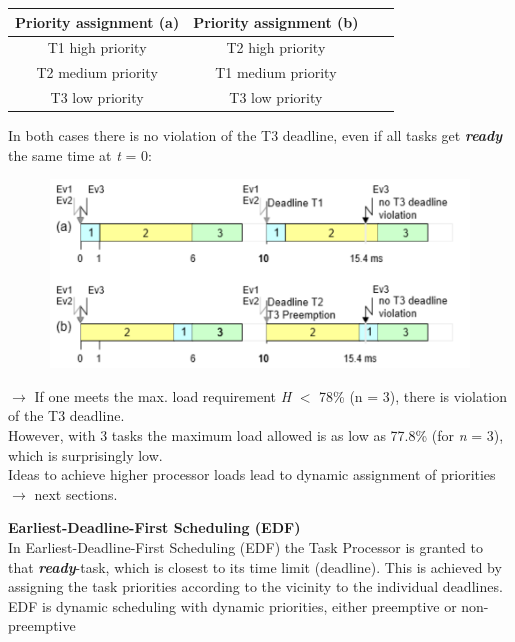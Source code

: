 \begin{table}[h!]
\setlength{\tabcolsep}{10pt} %
\renewcommand{\arraystretch}{1.5} %
\small
\centering
 \begin{tabular}{|c|c|c|c|} 
 \hline
 \textbf{Priority assignment (a)} & \textbf{Priority assignment (b)} \\ [0.1ex] 
 \hline
 T1  high priority & T2  high  priority \\ 
 \hline
 T2  medium priority & T1  medium priority \\ 
  \hline
 T3  low priority & T3  low priority  \\ 
 \hline
 \end{tabular}
\end{table}

In both cases there is no violation of the T3 deadline, even if all tasks get \textbf{\textit{ready}} the same time at \textit{t} = 0: 
	
	\begin{figure}[h]
    \centering
    \includegraphics[width=12cm, height=5cm]{Images/image187.png}
    \label{fig:Fig 46}
    \end{figure}
\nsl{\newpage}
$\rightarrow$ If one meets the max. load requirement \textit{H} $\mathrm{<}$ 78\% (n = 3), there is violation of the T3 deadline.\\

However, with 3 tasks the maximum load allowed is as low as 77.8\% (for \textit{n} = 3), which is surprisingly low.\\

Ideas to achieve higher processor loads lead to dynamic assignment of priorities \\
$\rightarrow$ next sections.\\
\os{\newpage}

{\rot\bf Earliest-Deadline-First Scheduling (EDF)}\\

In Earliest-Deadline-First Scheduling (EDF) the Task Processor is granted to that \textbf{\textit{ready}}-task, which is closest to its time limit (deadline). This is achieved by assigning the task priorities according to the vicinity to the individual deadlines. EDF is dynamic scheduling with dynamic priorities, either preemptive or non-preemptive\\

